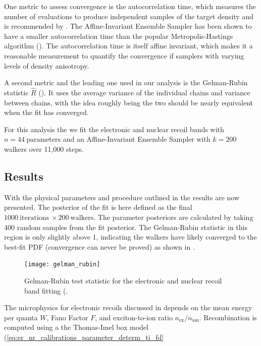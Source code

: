 One metric to assess convergence is the autocorrelation time, which measures the number
of evaluations to produce independent samples of the target density and is recommended by .  The Affine-Invariant
Ensemble Sampler has been shown to have a smaller autocorrelation time than the popular Metropolis-Hastings algorithm
().  The autocorrelation time is itself affine invariant, which makes it a reasonable measurement to quantify
the convergence if samplers with varying levels of density anisotropy.

A second metric and the leading one used in
our analysis is the Gelman-Rubin statistic $\hat{R}$ ().  It uses the average variance of the individual chains and variance
between chains, with the idea roughly being the two should be nearly equivalent when the fit has converged.

For this analysis the we fit the electronic and nuclear recoil bands with  $n = 44\ \mathrm{parameters}$ and an Affine-Invariant Ensemble
Sampler with $k = 200$ walkers over 11,000 steps.



\subsection{Results}
\label{subsec:er_nr_calibrations_results}
With the physical parameters and procedure outlined in  the results are now
presented.  The posterior of the fit is here defined as the final $1000\ \mathrm{iterations}\ \times 200\ \mathrm{walkers}$.  The
parameter posteriors are calculated by taking 400 random samples from the fit posterior.  The Gelman-Rubin statistic in this region is
only slightly above 1, indicating the walkers have likely converged to the best-fit PDF (convergence can never be proved) as shown in
.

\begin{figure}
\centering
\texttt{[image: gelman\_rubin]}
\caption{Gelman-Rubin test statistic for the electronic and nuclear recoil band fitting
(.}
\label{fig:er_nr_calibrations_results_gr}
\end{figure}

The microphysics for electronic recoils discussed in  depends on the mean energy
per quanta $W$, Fano Factor $F$, and exciton-to-ion ratio $n_{\mathrm{ex}} / n_{\mathrm{ion}}$.  Recombination is computed using
a the Thomas-Imel box model (\eqref{eq:er_nr_calibrations_parameter_determ_ti_fd}

